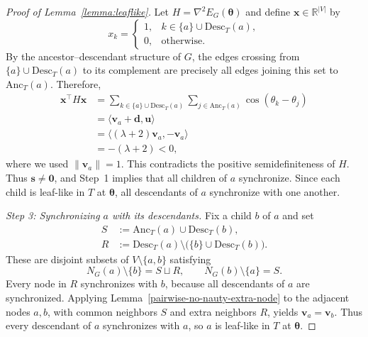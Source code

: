 \documentclass[10pt,a4paper]{amsart}
\begin{document}
\begin{proof}[Proof of Lemma~\ref{lemma:leaflike}]
Let $H=\nabla^2 E_G(\boldsymbol{\theta})$ and define
$\boldsymbol{x}\in\mathbb{R}^{|V|}$ by
\[
    x_k=
    \begin{cases}
        1, & k\in\{a\}\cup\mathrm{Desc}_T(a),\\
        0, & \text{otherwise}.
    \end{cases}
\]
By the ancestor--descendant structure of $G$, the edges
crossing from $\{a\}\cup\mathrm{Desc}_T(a)$ to its complement
are precisely all edges joining this set to
$\mathrm{Anc}_T(a)$.
Therefore,
\[
\begin{aligned}
    \boldsymbol{x}^{\top}H\boldsymbol{x}
    &=
    \sum_{k\in\{a\}\cup\mathrm{Desc}_T(a)}
    \sum_{j\in\mathrm{Anc}_T(a)}
    \cos(\theta_k-\theta_j)\\
    &=\langle\mathbf{v}_a+\mathbf{d},\mathbf{u}\rangle\\
    &=\langle(\lambda+2)\mathbf{v}_a,-\mathbf{v}_a\rangle\\
    &=-(\lambda+2)<0,
\end{aligned}
\]
where we used $\|\mathbf{v}_a\|=1$.
This contradicts the positive semidefiniteness of $H$.
Thus $\mathbf{s}\neq\boldsymbol{0}$, and Step~1 implies
that all children of $a$ synchronize.
Since each child is leaf-like in $T$ at
$\boldsymbol{\theta}$, all descendants of $a$ synchronize
with one another.

\medskip
\noindent
\textit{Step 3: Synchronizing $a$ with its descendants.}
Fix a child $b$ of $a$ and set
\[
\begin{aligned}
    S&:=\mathrm{Anc}_T(a)\cup\mathrm{Desc}_T(b),\\
    R&:=\mathrm{Desc}_T(a)\setminus
    \bigl(\{b\}\cup\mathrm{Desc}_T(b)\bigr).
\end{aligned}
\]
These are disjoint subsets of $V\setminus\{a,b\}$ satisfying
\[
    N_G(a)\setminus\{b\}=S\sqcup R,
    \qquad
    N_G(b)\setminus\{a\}=S.
\]
Every node in $R$ synchronizes with $b$, because all
descendants of $a$ are synchronized.
Applying Lemma~\ref{pairwise-no-nauty-extra-node} to the
adjacent nodes $a,b$, with common neighbors $S$ and extra
neighbors $R$, yields $\mathbf{v}_a=\mathbf{v}_b$.
Thus every descendant of $a$ synchronizes with $a$,
so $a$ is leaf-like in $T$ at $\boldsymbol{\theta}$.
\end{proof}
\end{document}
